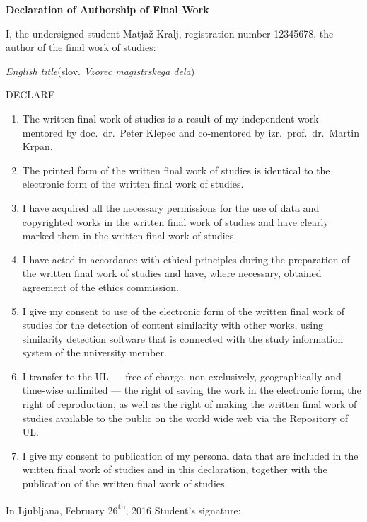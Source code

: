 \documentclass[a4paper, 12pt]{book}
\begin{document}

\vspace*{-12mm} %
\begin{center}
{\Large\textbf{\sc Declaration of Authorship of Final Work}}
\end{center}
%
\vspace{1mm}
\noindent I, the undersigned student Matjaž Kralj, registration number 12345678, the author of the final work of studies:

\vspace{1mm}
\noindent\emph{English title}\hspace{5mm}(slov. \emph{Vzorec magistrskega dela})

\vspace{1mm}
\begin{center}DECLARE\end{center}
\begin{enumerate}
\setlength\itemsep{0mm}
\item The written final work of studies is a result of my independent work mentored by doc.\ dr.\ Peter Klepec and co-mentored by izr.\ prof.\ dr.\ Martin Krpan.
\item The printed form of the written final work of studies is identical to the electronic form of the written final work of studies.
\item I have acquired all the necessary permissions for the use of data and copyrighted works in the written final work of studies and have clearly marked them in the written final work of studies.
\item I have acted in accordance with ethical principles during the preparation of the written final work of studies and have, where necessary, obtained agreement of the ethics commission.
\item I give my consent to use of the electronic form of the written final work of studies for the detection of content similarity with other works, using similarity detection software that is connected with the study information system of the university member.
\item I transfer to the UL --- free of charge, non-exclusively, geographically and time-wise unlimited --- the right of saving the work in the electronic form, the right of reproduction, as well as the right of making the written final work of studies available to the public on the world wide web via the Repository of UL.
\item I give my consent to publication of my personal data that are included in the written final work of studies and in this declaration, together with the publication of the written final work of studies.
\end{enumerate}

\vspace{2mm}
\noindent In Ljubljana, February 26{\textsuperscript{th}}, 2016 \hfill Student's signature:


\end{document}
